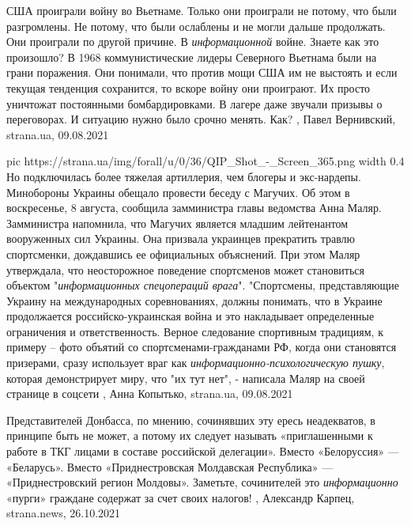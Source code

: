США проиграли войну во Вьетнаме.  Только они проиграли не потому, что были
разгромлены. Не потому, что были ослаблены и не могли дальше продолжать.  Они
проиграли по другой причине. В \emph{информационной} войне.  Знаете как это произошло?
В 1968 коммунистические лидеры Северного Вьетнама были на грани поражения. Они
понимали, что против мощи США им не выстоять и если текущая тенденция
сохранится, то вскоре войну они проиграют. Их просто уничтожат постоянными
бомбардировками. В лагере даже звучали призывы о переговорах. И ситуацию нужно
было срочно менять.  Как?
, 
Павел Вернивский, strana.ua, 09.08.2021

\ifcmt
  pic https://strana.ua/img/forall/u/0/36/QIP_Shot_-_Screen_365.png
  width 0.4
\fi
Но подключилась более тяжелая артиллерия, чем блогеры и экс-нардепы.
Минобороны Украины обещало провести беседу с Магучих. Об этом в воскресенье, 8
августа, сообщила замминистра главы ведомства Анна Маляр.  Замминистра
напомнила, что Магучих является младшим лейтенантом вооруженных сил Украины.
Она призвала украинцев прекратить травлю спортсменки, дождавшись ее официальных
объяснений.  При этом Маляр утверждала, что неосторожное поведение спортсменов
может становиться объектом "\emph{информационных спецопераций врага}".
"Спортсмены, представляющие Украину на международных соревнованиях, должны
понимать, что в Украине продолжается российско-украинская война и это
накладывает определенные ограничения и ответственность.  Верное следование
спортивным традициям, к примеру – фото объятий со спортсменами-гражданами РФ,
когда они становятся призерами, сразу использует враг как
\emph{информационно-психологическую пушку}, которая демонстрирует миру, что "их
тут нет", - написала Маляр на своей странице в соцсети
, 
Анна Копытько, strana.ua, 09.08.2021

Представителей Донбасса, по мнению, сочинявших эту ересь неадекватов, в
принципе быть не может, а потому их следует называть «приглашенными к работе в
ТКГ лицами в составе российской делегации».  Вместо «Белоруссия» — «Беларусь».
Вместо «Приднестровская Молдавская Республика» — «Приднестровский регион
Молдовы».  Заметьте, сочинителей это \emph{информационно} «пурги» граждане
содержат за счет своих налогов!
, 
Александр Карпец, strana.news, 26.10.2021

